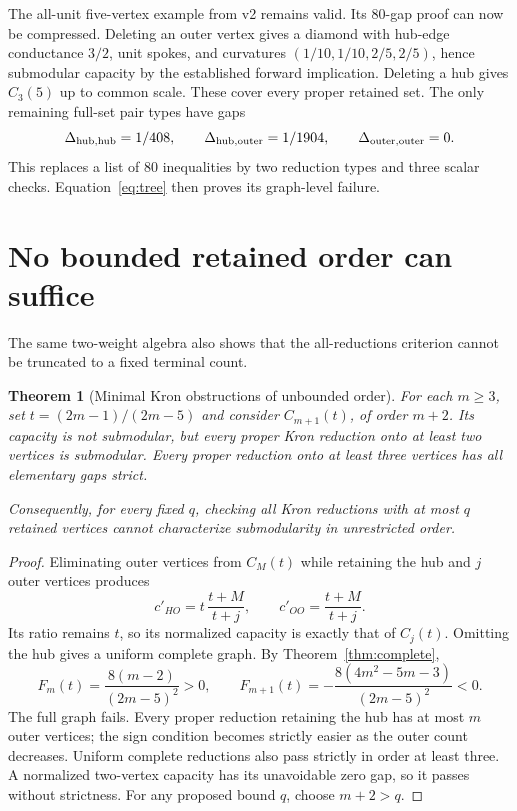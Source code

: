 \documentclass[11pt,a4paper]{article}
\newtheorem{theorem}{Theorem}
\newcommand{\Del}{\Delta}
\begin{document}
The all-unit five-vertex example from v2 remains valid. Its 80-gap proof can now be compressed. Deleting an outer vertex gives a diamond with hub-edge conductance $3/2$, unit spokes, and curvatures $(1/10,1/10,2/5,2/5)$, hence submodular capacity by the established forward implication. Deleting a hub gives $C_3(5)$ up to common scale. These cover every proper retained set. The only remaining full-set pair types have gaps
\[
\Del_{\rm hub,hub}=1/408,\qquad
\Del_{\rm hub,outer}=1/1904,\qquad
\Del_{\rm outer,outer}=0.
\]
This replaces a list of 80 inequalities by two reduction types and three scalar checks. Equation~\eqref{eq:tree} then proves its graph-level failure.

\section{No bounded retained order can suffice}
The same two-weight algebra also shows that the all-reductions criterion cannot be truncated to a fixed terminal count.

\begin{theorem}[Minimal Kron obstructions of unbounded order]\label{thm:hierarchy}
For each $m\ge3$, set $t=(2m-1)/(2m-5)$ and consider $C_{m+1}(t)$, of order $m+2$. Its capacity is not submodular, but every proper Kron reduction onto at least two vertices is submodular. Every proper reduction onto at least three vertices has all elementary gaps strict.

Consequently, for every fixed $q$, checking all Kron reductions with at most $q$ retained vertices cannot characterize submodularity in unrestricted order.
\end{theorem}
\begin{proof}
Eliminating outer vertices from $C_M(t)$ while retaining the hub and $j$ outer vertices produces
\[
c'_{HO}=t\,\frac{t+M}{t+j},\qquad
c'_{OO}=\frac{t+M}{t+j}.
\]
Its ratio remains $t$, so its normalized capacity is exactly that of $C_j(t)$. Omitting the hub gives a uniform complete graph. By Theorem~\ref{thm:complete},
\[
F_m(t)=\frac{8(m-2)}{(2m-5)^2}>0,\qquad
F_{m+1}(t)=-\frac{8(4m^2-5m-3)}{(2m-5)^2}<0.
\]
The full graph fails. Every proper reduction retaining the hub has at most $m$ outer vertices; the sign condition becomes strictly easier as the outer count decreases. Uniform complete reductions also pass strictly in order at least three. A normalized two-vertex capacity has its unavoidable zero gap, so it passes without strictness. For any proposed bound $q$, choose $m+2>q$.
\end{proof}
\end{document}
